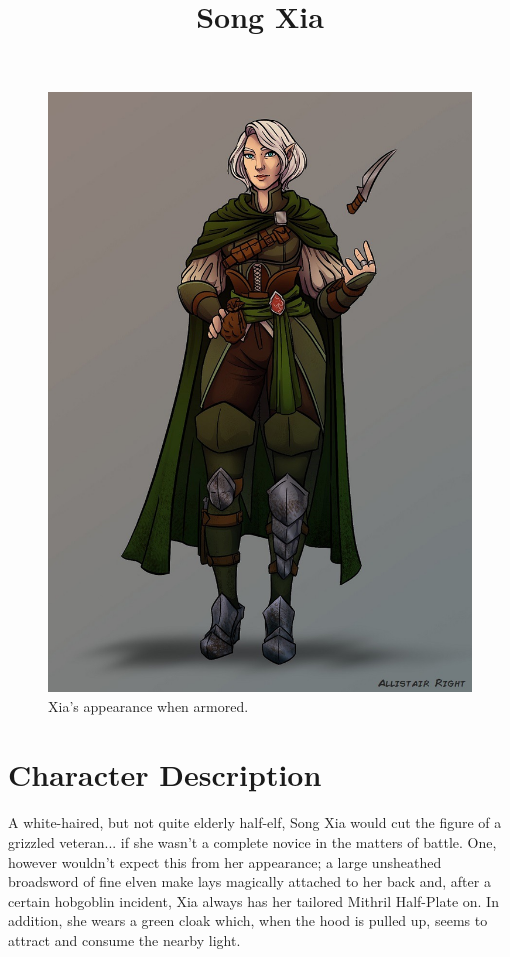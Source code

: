 \documentclass[12pt]{article}
\begin{document}
 
\title{Song Xia}
\date{}

\maketitle


\begin{figure}[H]
  \centering
  \includegraphics[width=.62\textwidth]{./resources/SongXia.jpg}
  \caption{Xia's appearance when armored.}
\end{figure}

\section{Character Description}

A white-haired, but not quite elderly half-elf, Song Xia would cut the figure of
a grizzled veteran... if she wasn't a complete novice in the matters of battle.
One, however wouldn't expect this from her appearance; a large unsheathed
broadsword of fine elven make lays magically attached to her back and, after
a certain hobgoblin incident, Xia always has her tailored Mithril Half-Plate on.
In addition, she wears a green cloak which, when the hood is pulled up, seems to
attract and consume the nearby light.
\end{document}
